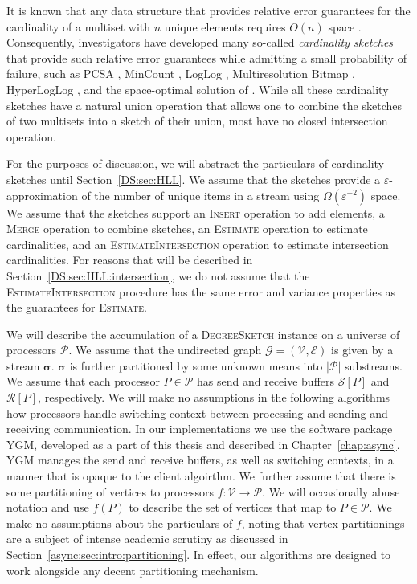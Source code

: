 \documentclass[10]{article}
\newcommand{\algoname}[1]{\textnormal{\textsc{#1}}}
\begin{document}
It is known that any data structure that provides relative error guarantees for the cardinality of a multiset with $n$ unique elements requires $O(n)$ space \cite{alon1999space}.
Consequently, investigators have developed many so-called \emph{cardinality sketches} that provide such relative error guarantees while admitting a small probability of failure, such as PCSA \cite{flajolet1985probabilistic}, MinCount \cite{bar2002counting},  LogLog \cite{durand2003loglog}, Multiresolution Bitmap \cite{estan2003bitmap}, HyperLogLog \cite{flajolet2007hyperloglog}, and the space-optimal solution of \cite{kane2010optimal}.
While all these cardinality sketches have a natural union operation that allows one to combine the sketches of two multisets into a sketch of their union, most have no closed intersection operation.

For the purposes of discussion, we will abstract the particulars of cardinality sketches until Section~\ref{DS:sec:HLL}.
We assume that the sketches provide a $\varepsilon$-approximation of the number of unique items in a stream using $\Omega(\varepsilon^{-2})$ space.
We assume that the sketches support an \algoname{Insert} operation to add elements, a \algoname{Merge} operation to combine sketches, an \algoname{Estimate} operation to estimate cardinalities, and an \algoname{EstimateIntersection} operation to estimate intersection cardinalities.
For reasons that will be described in Section~\ref{DS:sec:HLL:intersection}, we do not assume that the \algoname{EstimateIntersection} procedure has the same error and variance properties as the guarantees for \algoname{Estimate}.

We will describe the accumulation of a \algoname{DegreeSketch} instance on a universe of processors $\mathcal{P}$. 
We assume that the undirected graph $\mathcal{G} = (\mathcal{V}, \mathcal{E})$ is given by a stream $\boldsymbol{\sigma}$.
$\boldsymbol{\sigma}$ is further partitioned by some unknown means into $|\mathcal{P}|$ substreams.
We assume that each processor $P \in \mathcal{P}$ has send and receive buffers $\mathcal{S}[P]$ and $\mathcal{R}[P]$, respectively.
We will make no assumptions in the following algorithms how processors handle switching context between processing and sending and receiving communication. 
In our implementations we use the software package \algoname{YGM}, developed as a part of this thesis and described in Chapter~\ref{chap:async}.
\algoname{YGM} manages the send and receive buffers, as well as switching contexts, in a manner that is opaque to the client algoirthm.
We further assume that there is some partitioning of vertices to processors $f : \mathcal{V} \rightarrow \mathcal{P}$. 
We will occasionally abuse notation and use $f(P)$ to describe the set of vertices that map to $P \in \mathcal{P}$.
We make no assumptions about the particulars of $f$, noting that vertex partitionings are a subject of intense academic scrutiny as discussed in Section~\ref{async:sec:intro:partitioning}.
In effect, our algorithms are designed to work alongside any decent partitioning mechanism. 
\end{document}
